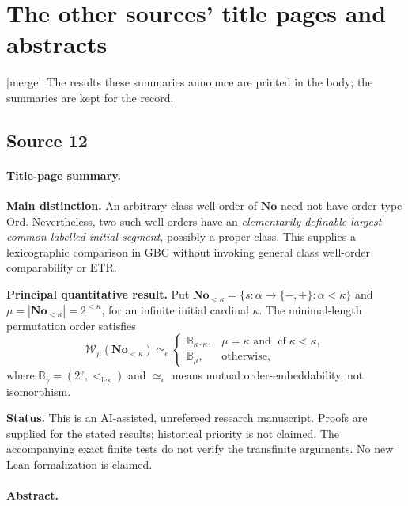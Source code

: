 \documentclass[11pt]{article}
\theoremstyle{definition}
\theoremstyle{remark}
\newcommand{\No}{\mathbf{No}}
\newcommand{\Ord}{\mathrm{Ord}}
\newcommand{\WO}{\mathcal W}
\newcommand{\BB}{\mathbb B}
\newcommand{\lex}{\mathrm{lex}}
\newcommand{\cf}{\operatorname{cf}}
\newcommand{\equim}{\mathrel{\simeq_{\!e}}}
\newcommand{\merge}{\textsf{[merge]}}
\begin{document}
\section{The other sources' title pages and abstracts}\label{swo:app:abstracts}

\merge\ The results these summaries announce are printed in the body; the
summaries are kept for the record.

\subsection*{Source 12}
\paragraph{Title-page summary.}

\textbf{Main distinction.} An arbitrary class well-order of $\No$ need not
have order type $\Ord$. Nevertheless, two such well-orders have an
\emph{elementarily definable largest common labelled initial segment},
possibly a proper class. This supplies a lexicographic comparison in GBC
without invoking general class well-order comparability or ETR.

\medskip
\textbf{Principal quantitative result.} Put
$\No_{<\kappa}=\{s:\alpha\to\{-,+\}:\alpha<\kappa\}$ and
$\mu=|\No_{<\kappa}|=2^{<\kappa}$, for an infinite initial cardinal $\kappa$.
The minimal-length permutation order satisfies
\[
\WO_\mu(\No_{<\kappa})\equim
\begin{cases}
\BB_{\kappa\cdot\kappa},&\mu=\kappa\text{ and }\cf\kappa<\kappa,\\
\BB_\mu,&\text{otherwise},
\end{cases}
\]
where $\BB_\gamma=(2^\gamma,<_{\lex})$ and $\equim$ means mutual
order-embeddability, not isomorphism.

\medskip
\textbf{Status.} This is an AI-assisted, unrefereed research manuscript.
Proofs are supplied for the stated results; historical priority is not
claimed. The accompanying exact finite tests do not verify the transfinite
arguments. No new Lean formalization is claimed.


\paragraph{Abstract.}
\end{document}
